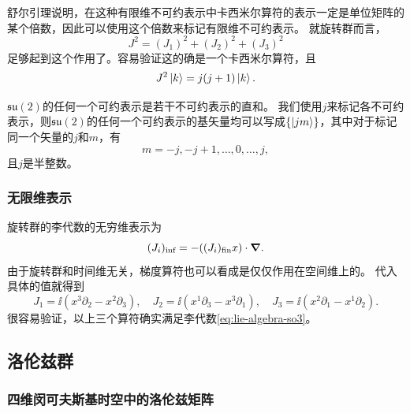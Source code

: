 舒尔引理说明，在这种有限维不可约表示中卡西米尔算符的表示一定是单位矩阵的某个倍数，因此可以使用这个倍数来标记有限维不可约表示。
就旋转群而言，
\begin{equation}
    J^2 = (J_1)^2 + (J_2)^2 + (J_3)^2
\end{equation}
足够起到这个作用了。容易验证这的确是一个卡西米尔算符，且
\begin{equation}
    J^2 \ket{k} = j (j+1) \ket{k}.
\end{equation}

$\mathfrak{su}(2)$的任何一个可约表示是若干不可约表示的直和。
我们使用$j$来标记各不可约表示，则$\mathfrak{su}(2)$的任何一个可约表示的基矢量均可以写成$\{\ket{jm}\}$，其中对于标记同一个矢量的$j$和$m$，有
\[
    m = -j, -j+1, \ldots, 0, \ldots, j,
\]
且$j$是半整数。

\subsubsection{无限维表示}

旋转群的李代数的无穷维表示为
\[
    (J_i)_\text{inf} = - ((J_i)_\text{fin} x) \cdot \grad.
\]
由于旋转群和时间维无关，梯度算符也可以看成是仅仅作用在空间维上的。
代入具体的值就得到
\begin{equation}
    J_1 = \ii (x^3 \partial_2 - x^2 \partial_3), \quad J_2 = \ii (x^1 \partial_3 - x^3 \partial_1), \quad
    J_3 = \ii (x^2 \partial_1 - x^1 \partial_2).
    \label{eq:rotation-inf-rep}
\end{equation}
很容易验证，以上三个算符确实满足李代数\eqref{eq:lie-algebra-so3}。

\subsection{洛伦兹群}

\subsubsection{四维闵可夫斯基时空中的洛伦兹矩阵}

